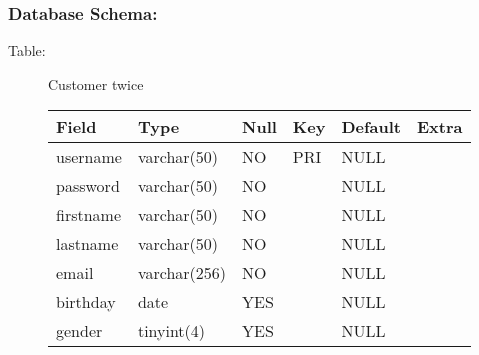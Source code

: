 		\subsubsection{Database Schema:}
			\begin{description}
				\item[Table:] Customer twice

				\begin{center}
					\begin{tabular}{ | l | l | l | l | l | l|}
						\hline
						Field & Type & Null & Key & Default & Extra \\ \hline \hline
						username & varchar(50) & NO & PRI & NULL & \hspace{1 pc} \\ \hline
						password & varchar(50) & NO & \hspace{1 pc} & NULL &\hspace{1 pc}  \\ \hline
						firstname & varchar(50) & NO & \hspace{1 pc}& NULL &\hspace{1 pc}  \\ \hline
						lastname & varchar(50) & NO &\hspace{1 pc} & NULL &\hspace{1 pc}  \\ \hline
						email & varchar(256) & NO &\hspace{1 pc} & NULL &\hspace{1 pc}   \\\hline
						birthday & date & YES &\hspace{1 pc} & NULL & \hspace{1 pc} \\ \hline
						gender & tinyint(4) & YES &\hspace{1 pc} & NULL &\hspace{1 pc}  \\
						\hline
					\end{tabular}
				\end{center}


\end{description}

